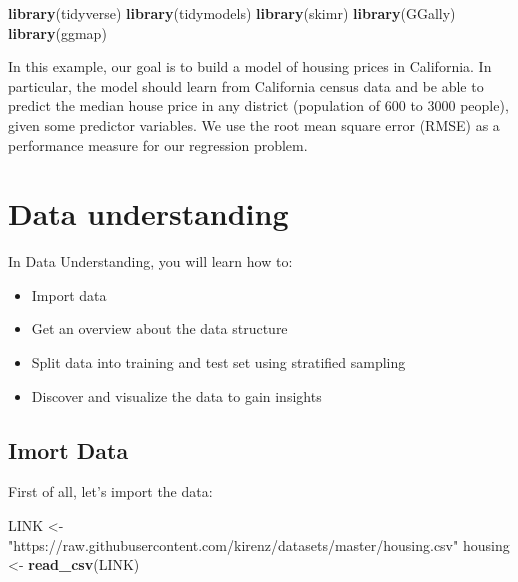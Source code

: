 \documentclass[
]{book}
\newenvironment{Shaded}{\begin{snugshade}}{\end{snugshade}}
\newcommand{\KeywordTok}[1]{\textcolor[rgb]{0.13,0.29,0.53}{\textbf{#1}}}
\newcommand{\NormalTok}[1]{#1}
\newcommand{\StringTok}[1]{\textcolor[rgb]{0.31,0.60,0.02}{#1}}
\providecommand{\tightlist}{%
  \setlength{\itemsep}{0pt}\setlength{\parskip}{0pt}}
\begin{document}
\begin{Shaded}
\begin{Highlighting}[]
\KeywordTok{library}\NormalTok{(tidyverse)}
\KeywordTok{library}\NormalTok{(tidymodels)}
\KeywordTok{library}\NormalTok{(skimr)}
\KeywordTok{library}\NormalTok{(GGally)}
\KeywordTok{library}\NormalTok{(ggmap)}
\end{Highlighting}
\end{Shaded}

In this example, our goal is to build a model of housing prices in California. In particular, the model should learn from California census data and be able to predict the median house price in any district (population of 600 to 3000 people), given some predictor variables. We use the root mean square error (RMSE) as a performance measure for our regression problem.

\hypertarget{data-understanding}{%
\section{Data understanding}\label{data-understanding}}

In Data Understanding, you will learn how to:

\begin{itemize}
\tightlist
\item
  Import data
\item
  Get an overview about the data structure
\item
  Split data into training and test set using stratified sampling
\item
  Discover and visualize the data to gain insights
\end{itemize}

\hypertarget{imort-data}{%
\subsection{Imort Data}\label{imort-data}}

First of all, let's import the data:

\begin{Shaded}
\begin{Highlighting}[]
\NormalTok{LINK \textless{}{-}}\StringTok{ "https://raw.githubusercontent.com/kirenz/datasets/master/housing.csv"}
\NormalTok{housing \textless{}{-}}\StringTok{ }\KeywordTok{read\_csv}\NormalTok{(LINK)}
\end{Highlighting}
\end{Shaded}
\end{document}
